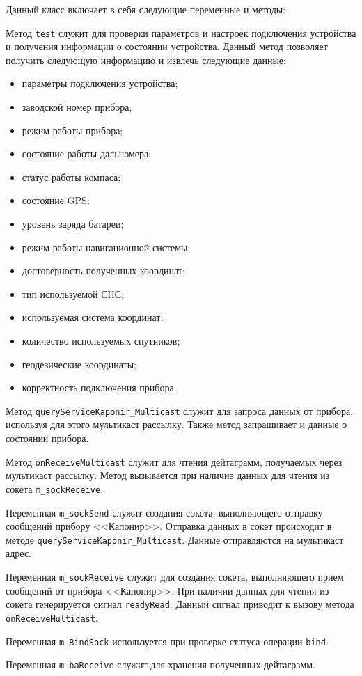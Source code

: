 Данный класс включает в себя следующие переменные и методы:
\begin{enum}
	\item Метод \texttt{test} служит для проверки параметров и настроек подключения устройства и получения
		информации о состоянии устройства. Данный метод позволяет получить следующую информацию и извлечь
		следующие данные:
		\begin{itemize}
			\item параметры подключения устройства;
			\item заводской номер прибора;
			\item режим работы прибора;
			\item состояние работы дальномера;
			\item статус работы компаса;
			\item состояние GPS;
			\item уровень заряда батареи;
			\item режим работы навигационной системы;
			\item достоверность полученных координат;
			\item тип используемой СНС;
			\item используемая система координат;
			\item количество используемых спутников;
			\item геодезические координаты;
			\item корректность подключения прибора.
		\end{itemize}

	\item Метод \texttt{queryServiceKaponir\_Multicast} служит для запроса данных от прибора, используя для этого
		мультикаст рассылку. Также метод запрашивает и данные о состоянии прибора.

	\item Метод \texttt{onReceiveMulticast} служит для чтения дейтаграмм, получаемых через мультикаст рассылку.
		Метод вызывается при наличие данных для чтения из сокета \texttt{m\_sockReceive}.

	\item Переменная \texttt{m\_sockSend} служит создания сокета, выполняющего отправку сообщений прибору
		<<Капонир>>. Отправка данных в сокет происходит в методе \texttt{queryServiceKaponir\_Multicast}. Данные
		отправляются на мультикаст адрес.

	\item Переменная \texttt{m\_sockReceive} служит для создания сокета, выполняющего прием сообщений от прибора
		<<Капонир>>. При наличии данных для чтения из сокета генерируется сигнал \texttt{readyRead}. Данный
		сигнал приводит к вызову метода \texttt{onReceiveMulticast}.

	\item Переменная \texttt{m\_BindSock} используется при проверке статуса операции \texttt{bind}.

	\item Переменная \texttt{m\_baReceive} служит для хранения полученных дейтаграмм.
\end{enum}

